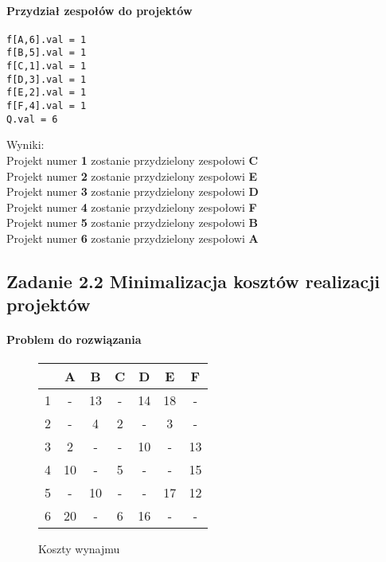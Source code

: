 \documentclass[12pt]{article}
\begin{document}
\paragraph{Przydział zespołów do projektów}
\begin{lstlisting}[caption=wynik z glpk]
f[A,6].val = 1
f[B,5].val = 1
f[C,1].val = 1
f[D,3].val = 1
f[E,2].val = 1
f[F,4].val = 1
Q.val = 6
\end{lstlisting}
Wyniki: \\
Projekt numer \textbf{1} zostanie przydzielony zespołowi \textbf{C} \\
Projekt numer \textbf{2} zostanie przydzielony zespołowi \textbf{E} \\
Projekt numer \textbf{3} zostanie przydzielony zespołowi \textbf{D} \\
Projekt numer \textbf{4} zostanie przydzielony zespołowi \textbf{F} \\
Projekt numer \textbf{5} zostanie przydzielony zespołowi \textbf{B} \\
Projekt numer \textbf{6} zostanie przydzielony zespołowi \textbf{A} \\
\subsection{Zadanie 2.2 Minimalizacja kosztów realizacji projektów}
\paragraph{Problem do rozwiązania}
\begin{figure}[htb]
\caption{Koszty wynajmu}
\begin{center}
\begin{tabular}{ | c | c | c | c | c | c | c | }
\hline
  & A & B & C & D & E & F \\ 
 \hline
 1 & - & 13 & - & 14 & 18 & - \\  
 \hline
 2 & - & 4 & 2 & - & 3 & - \\
 \hline  
 3 & 2 & - & - & 10 & - & 13 \\
 \hline  
 4 & 10 & - & 5 & - & - & 15 \\
 \hline  
 5 & - & 10 & - & - & 17 & 12 \\
 \hline  
 6 & 20 & - & 6 & 16 & - & - \\
 \hline
\end{tabular}
\end{center}
\end{figure}
\end{document}
